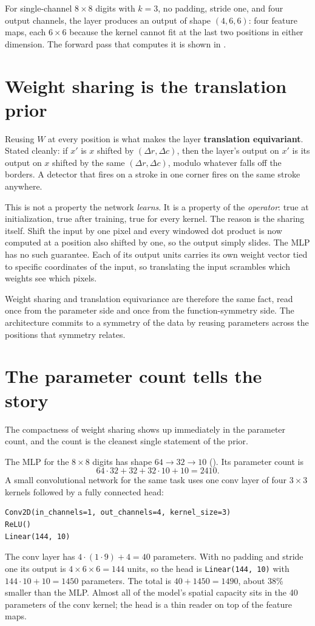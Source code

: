 For single-channel $8 \times 8$ digits with $k = 3$, no padding, stride one,
and four output channels, the layer produces an output of shape $(4, 6, 6)$:
four feature maps, each $6 \times 6$ because the kernel cannot fit at the
last two positions in either dimension. The forward pass that computes it is
shown in .

\section{Weight sharing is the translation prior}\label{sec:weight-sharing}

Reusing $W$ at every position is what makes the layer \textbf{translation
equivariant}. Stated cleanly: if $x'$ is $x$ shifted by $(\Delta r, \Delta
c)$, then the layer's output on $x'$ is its output on $x$ shifted by the same
$(\Delta r, \Delta c)$, modulo whatever falls off the borders. A detector
that fires on a stroke in one corner fires on the same stroke anywhere.

This is not a property the network \emph{learns}. It is a property of the
\emph{operator}: true at initialization, true after training, true for every
kernel. The reason is the sharing itself. Shift the input by one pixel and
every windowed dot product is now computed at a position also shifted by one,
so the output simply slides. The MLP has no such guarantee. Each of its
output units carries its own weight vector tied to specific coordinates of
the input, so translating the input scrambles which weights see which pixels.

Weight sharing and translation equivariance are therefore the same fact, read
once from the parameter side and once from the function-symmetry side. The
architecture commits to a symmetry of the data by reusing parameters across
the positions that symmetry relates.

\section{The parameter count tells the story}\label{sec:conv-params}

The compactness of weight sharing shows up immediately in the parameter
count, and the count is the cleanest single statement of the prior.

The MLP for the $8 \times 8$ digits has shape $64 \to 32 \to 10$
(). Its parameter count is
\[
  64 \cdot 32 + 32 + 32 \cdot 10 + 10 = 2410.
\]
A small convolutional network for the same task uses one conv layer of four
$3 \times 3$ kernels followed by a fully connected head:
\begin{lstlisting}
Conv2D(in_channels=1, out_channels=4, kernel_size=3)
ReLU()
Linear(144, 10)
\end{lstlisting}
The conv layer has $4 \cdot (1 \cdot 9) + 4 = 40$ parameters. With no padding
and stride one its output is $4 \times 6 \times 6 = 144$ units, so the head is
\texttt{Linear(144, 10)} with $144 \cdot 10 + 10 = 1450$ parameters. The total
is $40 + 1450 = 1490$, about 38\% smaller than the MLP. Almost all of the
model's spatial capacity sits in the 40 parameters of the conv kernel; the
head is a thin reader on top of the feature maps.

